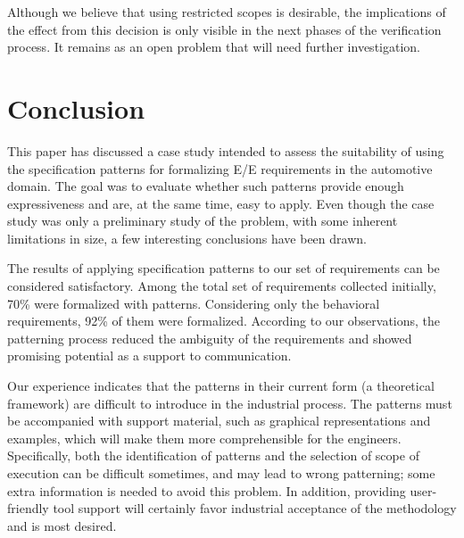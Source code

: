 \documentclass[conference]{IEEEtran}
\begin{document}
Although we believe that using restricted scopes is desirable, the implications of the effect from this decision is only visible in the next phases of the verification process. It remains as an open problem that will need further investigation.

\section{Conclusion}
This paper has discussed a case study intended to assess the suitability of using the specification patterns \cite{Konrad05sps} for formalizing E/E requirements in the automotive domain. The goal was to evaluate whether such patterns provide enough expressiveness and are, at the same time, easy to apply. Even though the case study was only a preliminary study of the problem, with some inherent limitations in size, a few interesting conclusions have been drawn.

The results of applying specification patterns to our set of requirements can be considered satisfactory. Among the  total set of requirements collected initially, 70\% were formalized with patterns. Considering only the behavioral requirements, 92\% of them were formalized. According to our observations, the patterning process reduced the ambiguity of the requirements and showed promising potential as a support to communication.

Our experience indicates that the patterns in their current form (a theoretical framework) are difficult to introduce in the industrial process. The patterns must be accompanied with support material, such as graphical representations and examples, which will make them more comprehensible for the engineers. Specifically, both the identification of patterns and the selection of scope of execution can be difficult sometimes, and may lead to wrong patterning; some extra information is needed to avoid this problem. In addition, providing user-friendly tool support will certainly favor industrial acceptance of the methodology and is most desired.
\end{document}
